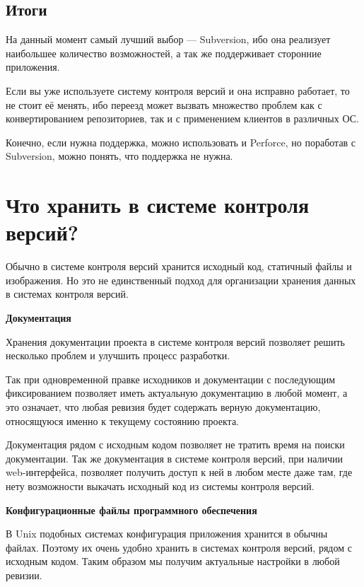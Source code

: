 \subsection{ Итоги } \label{sect2_4_7}

На данный момент самый лучший выбор --- Subversion, ибо она реализует наибольшее количество возможностей, а так же поддерживает сторонние приложения.

Если вы уже используете систему контроля версий и она исправно работает, то не стоит её менять, ибо переезд может вызвать множество проблем как с конвертированием репозиториев, так и с применением клиентов в различных ОС.

Конечно, если нужна поддержка, можно использовать и Perforce, но поработав с Subversion, можно понять, что поддержка не нужна.


\section{ Что хранить в системе контроля версий? } \label{sect2_5}

Обычно в системе контроля версий хранится исходный код, статичный файлы и изображения. Но это не единственный подход для организации хранения данных в системах контроля версий.

\textbf{ Документация } %

Хранения документации проекта в системе контроля версий позволяет решить несколько проблем и улучшить процесс разработки.

Так при одновременной правке исходников и документации с последующим фиксированием позволяет иметь актуальную документацию в любой момент, а это означает, что любая ревизия будет содержать верную документацию, относящуюся именно к текущему состоянию проекта.

Документация рядом с исходным кодом позволяет не тратить время на поиски документации. Так же документация в системе контроля версий, при наличии web-интерфейса, позволяет получить доступ к ней в любом месте даже там, где нету возможности выкачать исходный код из системы контроля версий.

\textbf{ Конфигурационные файлы программного обеспечения }%


В Unix подобных системах конфигурация приложения хранится в обычны файлах. Поэтому их очень удобно хранить в системах контроля версий, рядом с исходным кодом. Таким образом мы получим актуальные настройки  в любой ревизии.

